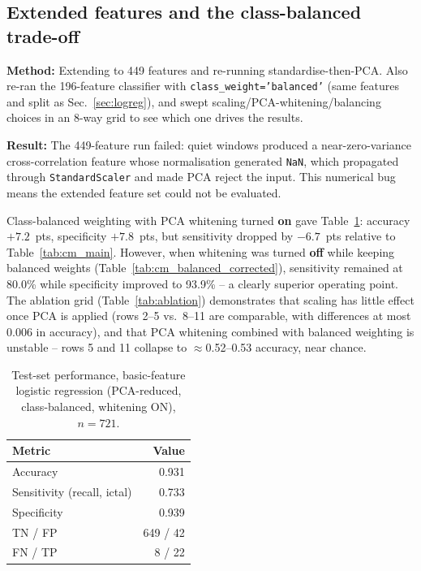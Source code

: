 ﻿\documentclass[a4paper,10pt]{article}
\begin{document}
\subsection{Extended features and the class-balanced trade-off}
\label{sec:extended}

\textbf{Method:} Extending to 449 features and re-running standardise-then-PCA. Also re-ran the 196-feature classifier with \texttt{class\_weight='balanced'} (same features and split as Sec.~\ref{sec:logreg}), and swept scaling/PCA-whitening/balancing choices in an 8-way grid to see which one drives the results.

\textbf{Result:} The 449-feature run failed: quiet windows produced a near-zero-variance cross-correlation feature whose normalisation generated \texttt{NaN}, which propagated through \texttt{StandardScaler} and made PCA reject the input. This numerical bug means the extended feature set could not be evaluated.

Class-balanced weighting with PCA whitening turned \textbf{on} gave Table~\ref{tab:cm_balanced}: accuracy $+7.2$~pts, specificity $+7.8$~pts, but sensitivity dropped by $-6.7$~pts relative to Table~\ref{tab:cm_main}. However, when whitening was turned \textbf{off} while keeping balanced weights (Table~\ref{tab:cm_balanced_corrected}), sensitivity remained at 80.0\% while specificity improved to 93.9\% -- a clearly superior operating point. The ablation grid (Table~\ref{tab:ablation}) demonstrates that scaling has little effect once PCA is applied (rows 2--5 vs.\ 8--11 are comparable, with differences at most 0.006 in accuracy), and that PCA whitening combined with balanced weighting is unstable -- rows 5 and 11 collapse to $\approx$0.52--0.53 accuracy, near chance.

\begin{table}[H]
\centering
\caption{Test-set performance, basic-feature logistic regression (PCA-reduced, class-balanced, whitening ON), $n=721$.}
\label{tab:cm_balanced}
\begin{tabular}{lr}
\toprule
Metric & Value \\
\midrule
Accuracy & 0.931 \\
Sensitivity (recall, ictal) & 0.733 \\
Specificity & 0.939 \\
TN / FP & 649 / 42 \\
FN / TP & 8 / 22 \\
\bottomrule
\end{tabular}
\end{table}
\end{document}
